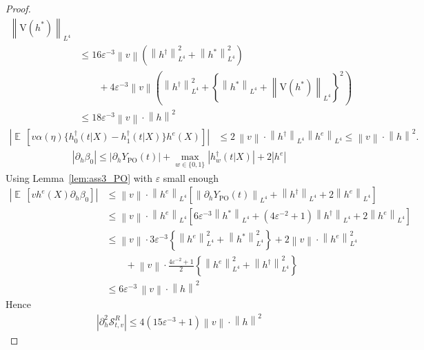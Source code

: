 \documentclass{article}
\DeclareMathOperator{\EX}{\mathbb{E}\,}
\newcommand{\norm}[1]{\left\lVert#1\right\rVert}
\newcommand{\YPO}{Y_{\mathrm{PO}}}
\begin{document}
\begin{proof}
\begin{align*}
\norm{\mathrm{V}(h^\ast)}_{L^4} \\
&\leq 16 \varepsilon^{-3} \norm{v}
\left(\norm{h^\dagger}_{L^4}^{2} + \norm{h^\ast}_{L^4}^2 \right) \\ 
& \qquad + 4 \varepsilon^{-3} \norm{v} 
\left( \norm{h^\dagger}_{L^4}^2 + \left\{ \norm{h^\ast}_{L^4} + \norm{\mathrm{V}(h^\ast)}_{L^4} \right\}^2 \right) \\ 
&\leq 18 \varepsilon^{-3} \norm{v} \cdot \norm{h}^2
\end{align*}
\begin{align*}
\left|\EX\!\left[ v\alpha(\eta) \{ h^\dagger_0(t|X) - h^\dagger_1(t|X) \} h^e(X) \right] \right|
&\leq 2\,\norm{v} \cdot \norm{h^\dagger}_{L^4} \norm{h^e}_{L^4}
\leq \norm{v} \cdot \norm{h}^2.
\end{align*}
\begin{align*}
\left| \partial_h \beta_0 \right| \leq \left| \partial_h \YPO(t) \right|
+ \max_{w \in \{0,1\}}\left|h_w^\dagger(t|X)\right|  + 2|h^e|
\end{align*}
Using Lemma~\ref{lem:ass3_PO} with $\varepsilon$ small enough
\begin{align*}
\left| \EX\!\left[ v h^e(X)\partial_h\beta_0 \right] \right| 
&\leq \norm{v} \cdot \norm{h^e}_{L^4} 
\left[ \norm{\partial_h \YPO(t)}_{L^4} 
+ \norm{h^\dagger}_{L^4} 
+ 2\norm{h^e}_{L^4}\right] \\
&\leq \norm{v} \cdot \norm{h^e}_{L^4} 
\left[ 6 \varepsilon^{-3} \norm{h^\ast}_{L^4} 
+ (4\varepsilon^{-2}+1) \norm{h^\dagger}_{L^4} 
+ 2\norm{h^e}_{L^4}\right] \\
&\leq  \norm{v} \cdot 3\varepsilon^{-3} \left\{ \norm{h^e}^2_{L^4} + \norm{h^\ast}^2_{L^4} \right\} 
+ 2 \norm{v} \cdot \norm{h^e}^2_{L^4}  \\ 
& \qquad + \norm{v} \cdot \frac{4\varepsilon^{-2}+1}{2} \left\{ \norm{h^e}^2_{L^4} + \norm{h^\dagger}^2_{L^4} \right\} \\ 
&\leq 6\varepsilon^{-3}\, \norm{v} \cdot \norm{h}^2 
\end{align*}
Hence 
\begin{align*}
|\partial_h^2 \mathcal{S}^R_{t,v}| \leq 4(15 \varepsilon^{-3} + 1) \norm{v} \cdot \norm{h}^2
\end{align*}

\end{proof}
\end{document}
